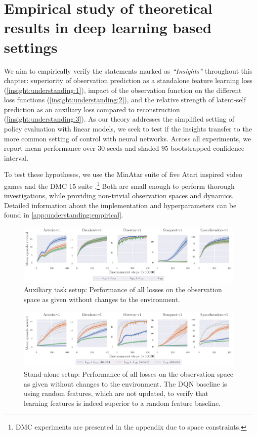 \section{Empirical study of theoretical results in deep learning based settings}
\label{sec:understanding:empirical}

We aim to empirically verify the statements marked as \emph{``Insights''} throughout this chapter: superiority of observation prediction as a standalone feature learning loss (\autoref{insight:understanding:1}), impact of the observation function on the different loss functions (\autoref{insight:understanding:2}), and the relative strength of latent-self prediction as an auxiliary loss compared to reconstruction (\autoref{insight:understanding:3}). 
As our theory addresses the simplified setting of policy evaluation with linear models, we seek to test if the insights transfer to the more common setting of control with neural networks.
Across all experiments, we report mean performance over 30 seeds and shaded $95$ bootstrapped confidence interval.

To test these hypotheses, we use the MinAtar suite of five Atari inspired video games \parencite{young19minatar} and the DMC 15 suite  \parencite{tunyasuvunakool2020}.\footnote{DMC experiments are presented in the appendix due to space constraints.}
Both are small enough to perform thorough investigations, while providing non-trivial observation spaces and dynamics.
Detailed information about the implementation and hyperparameters can be found in \autoref{app:understanding:empirical}.


\begin{figure}[b]
    \centering
    \includegraphics[width=\textwidth]{figures/understanding/rlc2024_minatar.pdf}
    \caption{Auxiliary task setup: Performance of all losses on the observation space as given without changes to the environment.}
    \label{fig:understanding:aux}
\end{figure}

\begin{figure}[t]
    \centering
    \includegraphics[width=\textwidth]{figures/understanding/rlc2024-detach_minatar.pdf}
    \caption{Stand-alone setup: Performance of all losses on the observation space as given without changes to the environment. The DQN baseline is using random features, which are not updated, to verify that learning features is indeed superior to a random feature baseline.}
    \label{fig:understanding:sta}
\end{figure}

